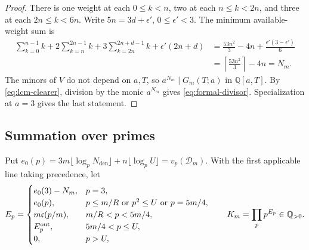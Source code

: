 \documentclass{amsart}
\numberwithin{equation}{section}
\numberwithin{table}{section}
\begin{document}
\begin{proof}
There is one weight at each $0\le k<n$, two at each $n\le k<2n$, and three
at each $2n\le k<6n$. Write $5n=3d+\epsilon'$, $0\le\epsilon'<3$. The minimum available-weight sum is
\begin{align*}
 \sum_{k=0}^{n-1}k+2\sum_{k=n}^{2n-1}k
 +3\sum_{k=2n}^{2n+d-1}k+\epsilon'(2n+d)
 &=\frac{53n^2}{3}-4n+\frac{\epsilon'(3-\epsilon')}6\\
 &=\left\lceil\frac{53n^2}{3}\right\rceil-4n=N_m.
\end{align*}
The minors of $V$ do not depend on $a,T$, so $a^{N_m}\mid G_m(T;a)$ in
$\mathbb Q[a,T]$. By \eqref{eq:lcm-clearer}, division by the monic
$a^{N_m}$ gives \eqref{eq:formal-divisor}. Specialization at $a=3$ gives
the last statement.
\end{proof}

\subsection{Summation over primes}
Put $e_0(p)=3m\lfloor\log_pN_{\mathrm{den}}\rfloor+n\lfloor\log_pU\rfloor=v_p(\mathcal D_m)$.
With the first applicable line taking precedence, let
\begin{equation}\label{eq:prime-exponents}
 E_p=\begin{cases}
 e_0(3)-N_m,&p=3,\\
 e_0(p),&p\le m/R\ \text{or}\ p^2\le U\ \text{or}\ p=5m/4,\\
 m\mathfrak c(p/m),&m/R<p<5m/4,\\
 E_p^{\rm out},&5m/4<p\le U,\\
 0,&p>U,
 \end{cases}
 \qquad
 K_m=\prod_{p}p^{E_p}\in\mathbb Q_{>0}.
\end{equation}
\end{document}
